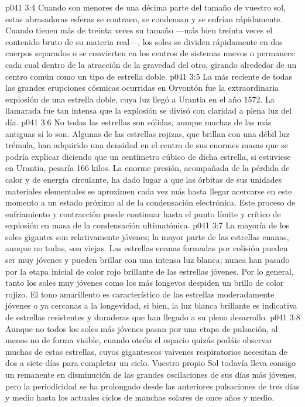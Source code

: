 \vs p041 3:4 Cuando son menores de una décima parte del tamaño de vuestro sol, estas abrasadoras esferas se contraen, se condensan y se enfrían rápidamente. Cuando tienen más de treinta veces su tamaño ---más bien treinta veces el contenido bruto de su materia real---, los soles se dividen rápidamente en dos cuerpos separados o se convierten en los centros de sistemas nuevos o permanece cada cual dentro de la atracción de la gravedad del otro, girando alrededor de un centro común como un tipo de estrella doble.
\vs p041 3:5 \pc La más reciente de todas las grandes erupciones cósmicas ocurridas en Orvontón fue la extraordinaria explosión de una estrella doble, cuya luz llegó a Urantia en el año 1572. La llamarada fue tan intensa que la explosión se divisó con claridad a plena luz del día.
\vs p041 3:6 \pc No todas las estrellas son sólidas, aunque muchas de las más antiguas sí lo son. Algunas de las estrellas rojizas, que brillan con una débil luz trémula, han adquirido una densidad en el centro de sus enormes masas que se podría explicar diciendo que un centímetro cúbico de dicha estrella, si estuviese en Urantia, pesaría 166 kilos. La enorme presión, acompañada de la pérdida de calor y de energía circulante, ha dado lugar a que las órbitas de sus unidades materiales elementales se aproximen cada vez más hasta llegar acercarse en este momento a un estado próximo al de la condensación electrónica. Este proceso de enfriamiento y contracción puede continuar hasta el punto límite y crítico de explosión en masa de la condensación ultimatónica.
\vs p041 3:7 La mayoría de los soles gigantes son relativamente jóvenes; la mayor parte de las estrellas enanas, aunque no todas, son viejas. Las estrellas enanas formadas por colisión pueden ser muy jóvenes y pueden brillar con una intensa luz blanca; nunca han pasado por la etapa inicial de color rojo brillante de las estrellas jóvenes. Por lo general, tanto los soles muy jóvenes como los más longevos despiden un brillo de color rojizo. El tono amarillento es característico de las estrellas moderadamente jóvenes o ya cercanas a la longevidad, si bien, la luz blanca brillante es indicativa de estrellas resistentes y duraderas que han llegado a su pleno desarrollo.
\vs p041 3:8 \pc Aunque no todos los soles más jóvenes pasan por una etapa de pulsación, al menos no de forma visible, cuando oteéis el espacio quizás podáis observar muchas de estas estrellas, cuyos gigantescos vaivenes respiratorios necesitan de dos a siete días para completar un ciclo. Vuestro propio Sol todavía lleva consigo un remanente en disminución de las grandes oscilaciones de sus días más jóvenes, pero la periodicidad se ha prolongado desde las anteriores pulsaciones de tres días y medio hasta los actuales ciclos de manchas solares de once años y medio.
